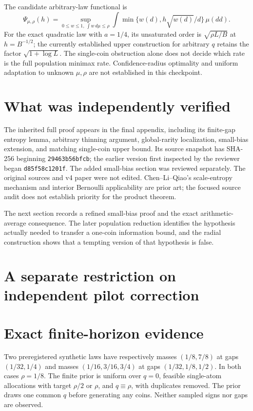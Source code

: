 \documentclass[11pt]{article}
\begin{document}
The candidate arbitrary-law functional is
\[
 \Psi_{\mu,\rho}(h)=\sup_{0\le w\le1,\ \int w\,d\mu\le\rho}
           \int\min\{w(d),h\sqrt{w(d)}/d\}\,\mu(dd).
\]
For the exact quadratic law with $a=1/4$, its unsaturated order is
$\sqrt{\rho L/B}$ at $h=B^{-1/2}$; the currently established upper
construction for arbitrary $q$ retains the factor $\sqrt{1+\log L}$.
The single-coin obstruction alone does not decide which rate is the full
population minimax rate. Confidence-radius optimality and uniform
adaptation to unknown $\mu,\rho$ are not established in this checkpoint.

\section{What was independently verified}
The inherited full proof appears in the final appendix, including its
finite-gap entropy lemma, arbitrary thinning argument, global-rarity
localization, small-bias extension, and matching single-coin upper bound.
Its source snapshot has SHA-256 beginning \texttt{29463b56bfcb}; the earlier
version first inspected by the reviewer began \texttt{d85f58c1201f}.
The added small-bias section was reviewed separately. The original sources
and v4 paper were not edited. Chen--Li--Qiao's scale-entropy mechanism and
interior Bernoulli applicability are prior art; the focused source audit
does not establish priority for the product theorem.

The next section records a refined small-bias proof and the exact
arithmetic-average consequence. The later population reduction identifies
the hypothesis actually needed to transfer a one-coin information bound,
and the radial construction shows that a tempting version of that
hypothesis is false.




\section{A separate restriction on independent pilot correction}


\section{Exact finite-horizon evidence}
Two preregistered synthetic laws have respectively masses
$(1/8,7/8)$ at gaps $(1/32,1/4)$ and masses $(1/16,3/16,3/4)$ at gaps
$(1/32,1/8,1/2)$. In both cases $\rho=1/8$. The finite prior is uniform
over $q=0$, feasible single-atom allocations with target $\rho/2$ or
$\rho$, and $q\equiv\rho$, with duplicates removed. The prior draws one
common $q$ before generating any coins. Neither sampled signs nor gaps
are observed.
\end{document}
